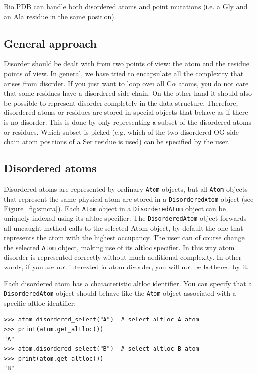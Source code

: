 Bio.PDB can handle both disordered atoms and point mutations (i.e. a
Gly and an Ala residue in the same position).

\subsection{General approach}
\label{sec:disorder_problems}

Disorder should be dealt with from two points of view: the atom and the residue
points of view. In general, we have tried to encapsulate all the complexity that
arises from disorder. If you just want to loop over all C$\alpha$ atoms,
you do not care that some residues have a disordered side chain. On the other
hand it should also be possible to represent disorder completely in the data
structure. Therefore, disordered atoms or residues are stored in special objects
that behave as if there is no disorder. This is done by only representing a
subset of the disordered atoms or residues. Which subset is picked (e.g. which
of the two disordered OG side chain atom positions of a Ser residue is used)
can be specified by the user.

\subsection{Disordered atoms}
\label{sec:disordered_atoms}

Disordered atoms are represented by ordinary \texttt{Atom} objects, but
all \texttt{Atom} objects that represent the same physical atom are stored
in a \texttt{Disordered\-Atom} object (see Figure~\ref{fig:smcra}).
Each \texttt{Atom} object in a \texttt{Disordered\-Atom} object can
be uniquely indexed using its altloc specifier. The \texttt{Disordered\-Atom}
object forwards all uncaught method calls to the selected Atom object,
by default the one that represents the atom with the highest
occupancy. The user can of course change the selected \texttt{Atom}
object, making use of its altloc specifier. In this way atom disorder
is represented correctly without much additional complexity. In other
words, if you are not interested in atom disorder, you will not be
bothered by it.

Each disordered atom has a characteristic altloc identifier. You can
specify that a \texttt{Disordered\-Atom} object should behave like
the \texttt{Atom} object associated with a specific altloc identifier:

\begin{verbatim}
>>> atom.disordered_select("A")  # select altloc A atom
>>> print(atom.get_altloc())
"A"
>>> atom.disordered_select("B")  # select altloc B atom
>>> print(atom.get_altloc())
"B"
\end{verbatim}

